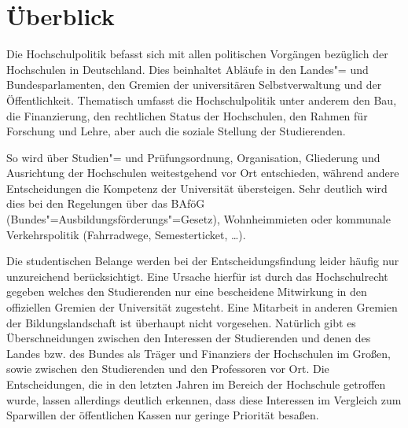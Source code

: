\section{Überblick}
\label{hopo}

Die Hochschulpolitik befasst sich mit allen politischen Vorgängen
bezüglich der Hochschulen in Deutschland. Dies beinhaltet Abläufe in den
Landes"= und Bundesparlamenten, den Gremien der universitären
Selbstverwaltung und der Öffentlichkeit. Thematisch umfasst die
Hochschulpolitik unter anderem den Bau, die Finanzierung, den rechtlichen
Status der Hochschulen, den Rahmen für Forschung und Lehre, aber auch die
soziale Stellung der Studierenden.

So wird über Studien"= und Prüfungsordnung, Organisation, Gliederung und
Ausrichtung der Hochschulen weitestgehend vor Ort entschieden, während
andere Entscheidungen die Kompetenz der Universität übersteigen. Sehr
deutlich wird dies bei den Regelungen über das BAföG
(Bundes"=Ausbildungsförderungs"=Gesetz), Wohnheimmieten oder kommunale
Verkehrspolitik (Fahrradwege, Semesterticket, \dots).

Die studentischen Belange werden bei der Entscheidungsfindung leider
häufig nur unzureichend berücksichtigt. Eine Ursache hierfür ist durch das
Hochschulrecht gegeben welches den Studierenden nur eine bescheidene
Mitwirkung in den offiziellen Gremien der Universität zugesteht. Eine
Mitarbeit in anderen Gremien der Bildungslandschaft ist überhaupt nicht
vorgesehen. Natürlich gibt es Überschneidungen zwischen den Interessen der
Studierenden und denen des Landes bzw. des Bundes als Träger und
Finanziers der Hochschulen im Großen, sowie zwischen den Studierenden und
den Professoren vor Ort. Die Entscheidungen, die in den letzten Jahren im
Bereich der Hochschule getroffen wurde, lassen allerdings deutlich
erkennen, dass diese Interessen im Vergleich zum Sparwillen der
öffentlichen Kassen nur geringe Priorität besaßen.

